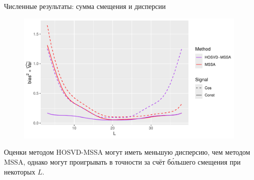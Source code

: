 \documentclass[pdf, unicode, 9pt, notheorems, handout]{beamer}
\begin{document}
\begin{frame}{Численные результаты: сумма смещения и дисперсии}
  \begin{figure}
    \centering
    \includegraphics[width=\textwidth]{../img/approx_sep_large_noise_mse}
  \end{figure}
  Оценки методом HOSVD-MSSA могут иметь меньшую дисперсию, чем
  методом MSSA, однако могут проигрывать в точности за счёт
  б\'{о}льшего смещения при некоторых $L$.
\end{frame}
\end{document}
